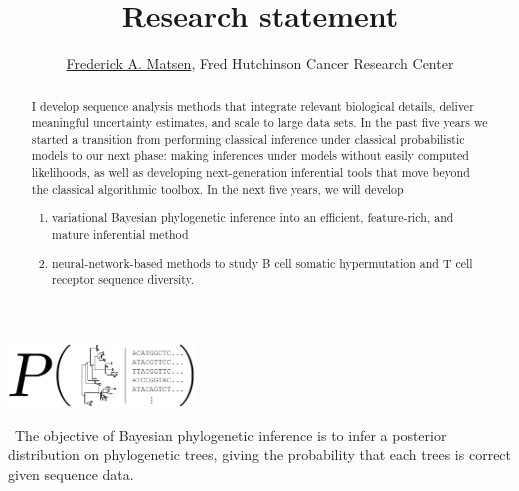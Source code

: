 \documentclass[nobib]{tufte-handout}
\title{Research statement}
\author{\href{http://matsen.fredhutch.org/}{Frederick A. Matsen}, Fred Hutchinson Cancer Research Center}
\begin{document}
\maketitle

\begin{abstract}
\noindent
I develop sequence analysis methods that integrate relevant biological details, deliver meaningful uncertainty estimates, and scale to large data sets.
In the past five years we started a transition from performing classical inference under classical probabilistic models to our next phase: making inferences under models without easily computed likelihoods, as well as developing next-generation inferential tools that move beyond the classical algorithmic toolbox.
In the next five years, we will develop
\begin{enumerate}
\item variational Bayesian phylogenetic inference into an efficient, feature-rich, and mature inferential method
\item neural-network-based methods to study B cell somatic hypermutation and T cell receptor sequence diversity.
\end{enumerate}
\end{abstract}

\begin{marginfigure}[1.8in]%
  \includegraphics[width=1.95in]{bayesian_phylo}
  \caption{\
The objective of Bayesian phylogenetic inference is to infer a posterior distribution on phylogenetic trees, giving the probability that each trees is correct given sequence data.
    }
  \label{FIGbayesPhylo}
\end{marginfigure}%


\vspace{0.3cm}
\end{document}
